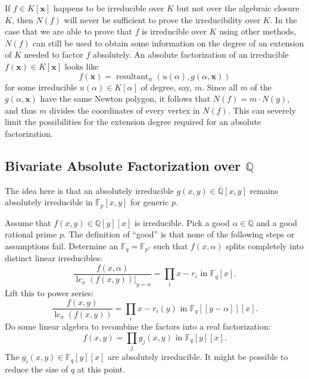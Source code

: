 \documentclass[11pt,reqno]{amsart}
\numberwithin{equation}{section}
\begin{document}
If $f \in K[\pmb{x}]$ happens to be irreducible over $K$ but not over the algebraic closure $\overline{K}$, then $N(f)$ will never be sufficient to prove the irreducibility over $K$. In the case that we are able to prove that $f$ is irreducible over $K$ using other methods, $N(f)$ can still be used to obtain some information on the degree of an extension of $K$ needed to factor $f$ absolutely. An absolute factorization of an irreducible $f(\pmb{x}) \in K[\pmb{x}]$ looks like
\begin{equation*}
f(\pmb{x}) = \operatorname{resultant}_{\alpha} (u(\alpha), g(\alpha, \pmb{x}))
\end{equation*}
for some irreducible $u(\alpha) \in K[\alpha]$ of degree, say, $m$. Since all $m$ of the $g(\alpha, \pmb{x})$ have the same Newton polygon, it follows that $N(f)=m\cdot N(g)$, and thus $m$ divides the coordinates of every vertex in $N(f)$. This can severely limit the possibilities for the extension degree required for an absolute factorization.

\subsection{Bivariate Absolute Factorization over $\mathbb{Q}$}
The idea here is that an absolutely irreducible $g(x,y) \in \overline{\mathbb{Q}}[x,y]$ remains absolutely irreducible in $\overline{\mathbb{F}}_p[x,y]$ for generic $p$.

Assume that $f(x,y) \in \mathbb{Q}[y][x]$ is irreducible. Pick a good $\alpha \in \mathbb{Q}$ and a good rational prime $p$. The definition of ``good'' is that none of the following steps or assumptions fail. Determine an $\mathbb{F}_q = \mathbb{F}_{p^?}$ such that $f(x,\alpha)$ splits completely into distinct linear irreducibles:
\begin{equation*}
\frac{f(x,\alpha)}{\operatorname{lc}_x(f(x,y)) |_{y=\alpha}} = \prod_i x - r_i \text{ in } \mathbb{F}_q[x]\text{.}
\end{equation*}
Lift this to power series:
\begin{equation*}
\frac{f(x,y)}{\operatorname{lc}_x(f(x,y))} = \prod_i x - r_i(y) \text{ in } \mathbb{F}_q[[y-\alpha]][x]\text{.}
\end{equation*}
Do some linear algebra to recombine the factors into a real factorization:
\begin{equation*}
f(x,y) = \prod_j g_j(x,y) \text{ in } \mathbb{F}_q[y][x]\text{.}
\end{equation*}
The $g_i(x,y) \in \mathbb{F}_q[y][x]$ are absolutely irreducible. It might be possible to reduce the size of $q$ at this point.
\end{document}

